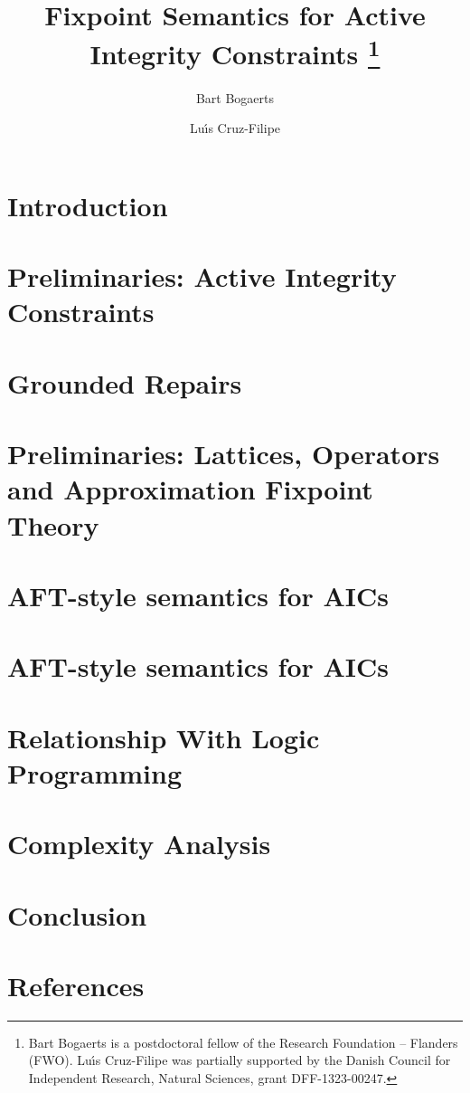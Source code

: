 \documentclass[3p,number,authoryear]{elsarticle}
\title{Fixpoint Semantics for Active Integrity Constraints%
\thanks{Bart Bogaerts is a postdoctoral fellow of the Research Foundation -- Flanders (FWO).
Lu\'\i s Cruz-Filipe was partially supported by the Danish Council for Independent Research, Natural Sciences, grant DFF-1323-00247.}
}
\author[kul]{Bart Bogaerts\corref{cor1}} \ead{bart.bogaerts@cs.kuleuven.be}
\author[sdu]{Lu\'\i s Cruz-Filipe} \ead{lcfilipe@gmail.com}
\begin{document}


\maketitle

\section{Introduction}\label{sec:intro}


\section{Preliminaries: Active Integrity Constraints}\label{sec:prelims}


\section{Grounded Repairs} \label{sec:grounded}


\section{Preliminaries: Lattices, Operators and Approximation Fixpoint Theory}\label{sec:aft}


\section{AFT-style semantics for AICs}\label{sec:operator}


\section{AFT-style semantics for AICs}\label{sec:approximator}


\section{Relationship With Logic Programming}\label{sec:lp}


\section{Complexity Analysis}\label{sec:complexity}



\section{Conclusion}\label{sec:concl}


\newpage
\section*{References}


\end{document}
